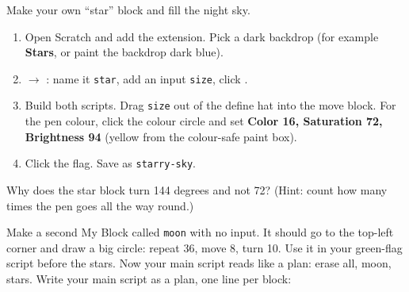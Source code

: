 \namedateline

\begin{core}
Make your own \enquote{star} block and fill the night sky.
\begin{enumerate}[leftmargin=1.4em,itemsep=1pt]
  \item Open Scratch and add the  extension. Pick a dark backdrop (for example \textbf{Stars}, or paint the backdrop dark blue).
  \item {} $\rightarrow$ : name it \texttt{star}, add an input \texttt{size}, click .
  \item Build both scripts. Drag \texttt{size} out of the define hat into the move block. For the pen colour, click the colour circle and set \textbf{Color 16, Saturation 72, Brightness 94} (yellow from the colour-safe paint box).
  \item Click the flag. Save as \texttt{starry-sky}.
\end{enumerate}
\begin{center}
\begin{scratch}[scale=0.75]
\end{scratch}
\hspace{0.5cm}
\begin{scratch}[scale=0.75]
\end{scratch}
\end{center}
Why does the star block turn 144 degrees and not 72? (Hint: count how many times the pen goes all the way round.)
\end{core}

\begin{challenge}
Make a second My Block called \texttt{moon} with no input. It should go to the top-left corner and draw a big circle: repeat 36, move 8, turn 10. Use it in your green-flag script before the stars. Now your main script reads like a plan: erase all, moon, stars.
Write your main script as a plan, one line per block:
\end{challenge}

